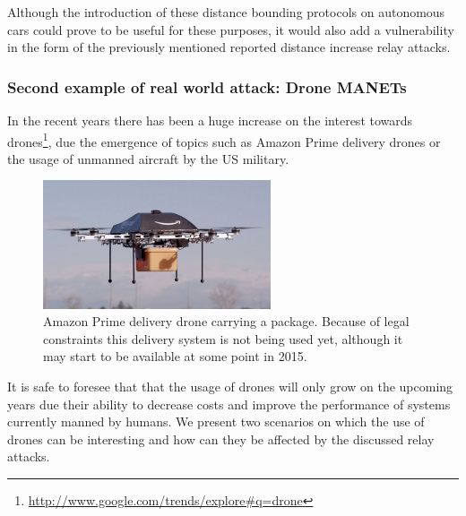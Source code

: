 \documentclass{article}
\begin{document}
Although the introduction of these distance bounding protocols on autonomous cars could prove to be useful for these purposes, it would also add a vulnerability in the form of the previously mentioned reported distance increase relay attacks.


\subsubsection{Second example of real world attack: Drone MANETs}

In the recent years there has been a huge increase on the interest towards drones\footnote{\url{http://www.google.com/trends/explore#q=drone}}, due the emergence of topics such as Amazon Prime delivery drones or the usage of unmanned aircraft by the US military.


\begin{figure}[h!]
  \centering
    \includegraphics[width=0.6\textwidth]{images/amazonprimedrone.png}
  \caption{Amazon Prime delivery drone carrying a package. Because of legal constraints this delivery system is not being used yet, although it may start to be available at some point in 2015.\protect\footnotemark[5]}
  \label{fig:amazondrone}
\end{figure}

\addtocounter{footnote}{1}

It is safe to foresee that that the usage of drones will only grow on the upcoming years due their ability to decrease costs and improve the performance of systems currently manned by humans. We present two scenarios on which the use of drones can be interesting and how can they be affected by the discussed relay attacks.
\end{document}
